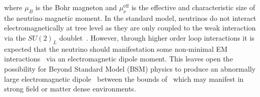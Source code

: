 where $\mu_{B}$ is the Bohr magneton and $\mu_{\nu}^\mathrm{eff}$ is the effective and characteristic size of the neutrino magnetic moment. In the standard model, neutrinos do not interact electromagnetically at tree level as they are only coupled to the weak interaction via the $SU(2)_{L}$ doublet~\citep{Schwartz:2014sze}. However, through higher order loop interactions it is expected that the neutrino should manifestation some non-minimal EM interactions~\citep{shrock1980new,abi2021prospects} via an electromagnetic dipole moment. This leaves open the possibility for Beyond Standard Model (BSM) physics to produce an abnormally large electromagnetic dipole~\citep{giunti2015neutrino,lindner2017revisiting,brdar2021neutrino} between the bounds of~ which may manifest in strong field or matter dense environments.

